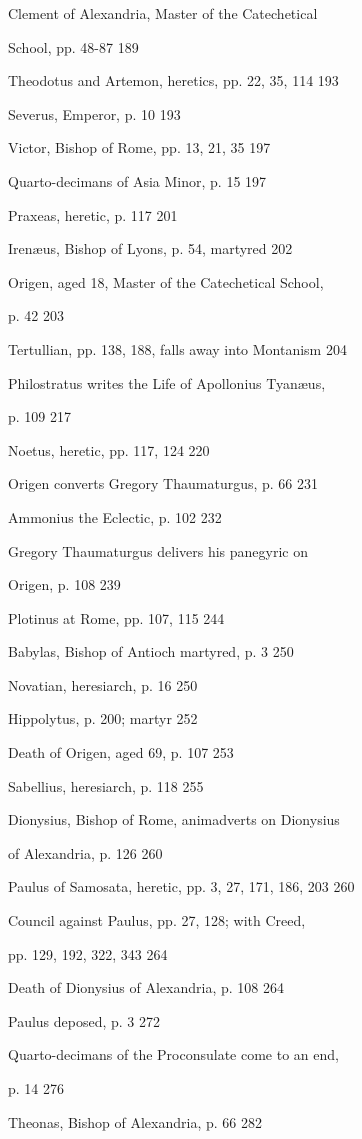 Clement of Alexandria, Master of the
Catechetical

School, pp. 48-87
189

Theodotus and Artemon, heretics, pp. 22, 35,
114
193

Severus, Emperor, p. 10
193

Victor, Bishop of Rome, pp. 13, 21, 35
197

Quarto-decimans of Asia Minor, p. 15
197

Praxeas, heretic, p. 117
201

Irenæus, Bishop of Lyons, p. 54, martyred
202

Origen, aged 18, Master of the Catechetical
School,

p. 42
203

Tertullian, pp. 138, 188, falls away into
Montanism
204

Philostratus writes the Life of Apollonius
Tyanæus,

p. 109
217

Noetus, heretic, pp. 117, 124
220

Origen converts Gregory Thaumaturgus, p. 66
231

Ammonius the Eclectic, p. 102
232

Gregory Thaumaturgus delivers his panegyric on

Origen, p. 108
239

Plotinus at Rome, pp. 107, 115
244

Babylas, Bishop of Antioch martyred, p. 3
250

Novatian, heresiarch, p. 16
250

Hippolytus, p. 200; martyr
252

Death of Origen, aged 69, p. 107
253

Sabellius, heresiarch, p. 118
255

Dionysius, Bishop of Rome, animadverts on
Dionysius 

of Alexandria, p. 126
260

Paulus of Samosata, heretic, pp. 3, 27, 171,
186, 203
260

Council against Paulus, pp. 27, 128; with
Creed,

pp. 129, 192, 322, 343
264

Death of Dionysius of Alexandria, p. 108
264

Paulus deposed, p. 3
272

Quarto-decimans of the Proconsulate come to an
end, 

p. 14
276

Theonas, Bishop of Alexandria, p. 66
282

